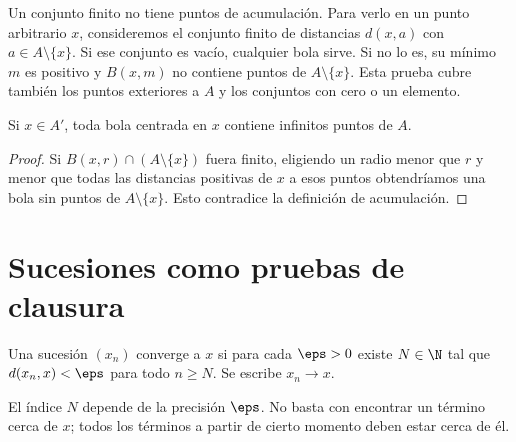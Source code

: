 Un conjunto finito no tiene puntos de acumulación. Para verlo en un punto arbitrario $x$, consideremos el conjunto finito de distancias $d(x,a)$ con $a\in A\setminus\{x\}$. Si ese conjunto es vacío, cualquier bola sirve. Si no lo es, su mínimo $m$ es positivo y $B(x,m)$ no contiene puntos de $A\setminus\{x\}$. Esta prueba cubre también los puntos exteriores a $A$ y los conjuntos con cero o un elemento.

\begin{lema}\label{ch03:infinitospuntos}
Si $x\in A'$, toda bola centrada en $x$ contiene infinitos puntos de $A$.
\end{lema}
\begin{proof}
Si $B(x,r)\cap(A\setminus\{x\})$ fuera finito, eligiendo un radio menor que $r$ y menor que todas las distancias positivas de $x$ a esos puntos obtendríamos una bola sin puntos de $A\setminus\{x\}$. Esto contradice la definición de acumulación.
\end{proof}

\section{Sucesiones como pruebas de clausura}
\begin{definicion}
Una sucesión $(x_n)$ converge a $x$ si para cada $\eps>0$ existe $N\in\N$ tal que $d(x_n,x)<\eps$ para todo $n\ge N$. Se escribe $x_n\to x$.
\end{definicion}
El índice $N$ depende de la precisión $\eps$. No basta con encontrar un término cerca de $x$; todos los términos a partir de cierto momento deben estar cerca de él.

